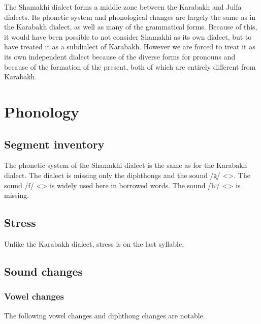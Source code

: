 The Shamakhi dialect forms a middle zone between the Karabakh and Julfa dialects. Its phonetic system and phonological changes are largely the same as in the Karabakh dialect, as well as many of the grammatical forms. Because of this, it would have been possible to not consider Shamakhi as its own dialect, but to have treated it as a subdialect of Karabakh. However we are forced to treat it as its own independent dialect because of the diverse forms for pronouns and because of the formation of the present, both of which are entirely different from Karabakh. 

\section{Phonology}

\subsection{Segment inventory}
The phonetic system of the Shamakhi dialect is the same as for the Karabakh dialect. The dialect is missing only the diphthongs and the sound /ə̟/ <>. The sound /f/ <> is widely used here in borrowed words. The sound /hʲ/ <> is missing. 

\subsection{Stress}
Unlike the Karabakh dialect, stress is on the last syllable. 

\subsection{Sound changes}

\subsubsection{Vowel changes}
The following vowel changes and diphthong changes are notable. 



